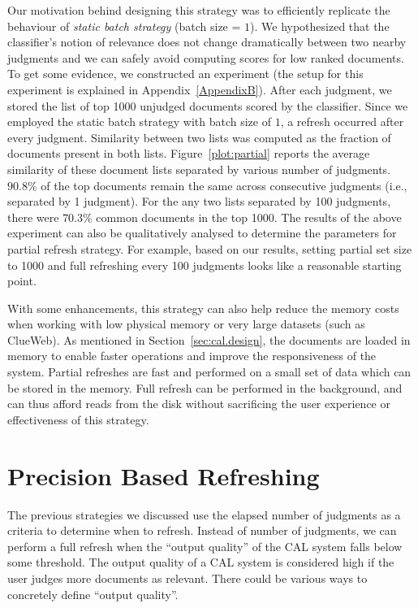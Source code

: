 Our motivation behind designing this strategy was to efficiently replicate the
behaviour of \textit{static batch strategy} (batch size = $1$). We hypothesized
that the classifier's notion of relevance does not change dramatically between
two nearby judgments and we can safely avoid computing scores for low ranked
documents. To get some evidence, we constructed an experiment (the setup for
this experiment is explained in Appendix~\ref{AppendixB}). After each judgment, we stored
the list of top 1000 unjudged documents scored by the classifier. Since we
employed the static batch strategy with batch size of $1$, a refresh occurred
after every judgment. Similarity between two lists was computed as the fraction
of documents present in both lists.  Figure~\ref{plot:partial} reports the
average similarity of these document lists separated by various number of
judgments. $90.8\%$ of the top documents remain the same across consecutive
judgments (i.e., separated by 1 judgment). For the any two lists separated by
100 judgments, there were $70.3\%$ common documents in the top 1000.  The
results of the above experiment can also be qualitatively analysed to determine
the parameters for partial refresh strategy. For example, based on our results,
setting partial set size to 1000 and full refreshing every 100 judgments looks
like a reasonable starting point.

With some enhancements, this strategy can also help reduce the memory costs
when working with low physical memory or very large datasets (such as ClueWeb).
As mentioned in Section~\ref{sec:cal.design}, the documents are loaded in memory
to enable faster operations and improve the responsiveness of the system.
Partial refreshes are fast and performed on a small set of data which can be
stored in the memory. Full refresh can be performed in the background, and can
thus afford reads from the disk without sacrificing the user experience or
effectiveness of this strategy.

\section{Precision Based Refreshing}

The previous strategies we discussed use the elapsed number of judgments as
a criteria to determine when to refresh. Instead of number of judgments, we can
perform a full refresh when the ``output quality'' of the CAL system falls below
some threshold. The output quality of a CAL system is considered high if the
user judges more documents as relevant. There could be various ways to
concretely define ``output quality''.

